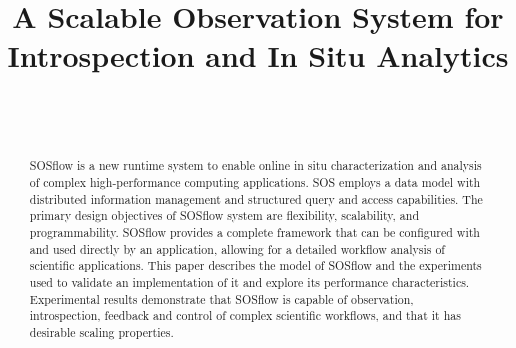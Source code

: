 
\title{A Scalable Observation System for Introspection and In Situ Analytics}

\author{
        \\
        \\
}

\maketitle



\begin{abstract} %
SOSflow is a new runtime system to enable online in situ
characterization and analysis of complex high-performance computing
applications.
%
SOS employs a data model with distributed information management and
structured query and access capabilities.
%
The primary design objectives of SOSflow system are flexibility,
scalability, and programmability.
%
SOSflow provides a complete framework that can be configured with and
used directly by an application, allowing for a detailed workflow
analysis of scientific applications.
%
This paper describes the model of SOSflow and
the experiments used to validate an implementation of it and explore its
performance characteristics.
%
Experimental results demonstrate that SOSflow is capable of
observation, introspection, feedback and control of complex scientific
workflows, and that it has desirable scaling properties.
%
%


\end{abstract}


